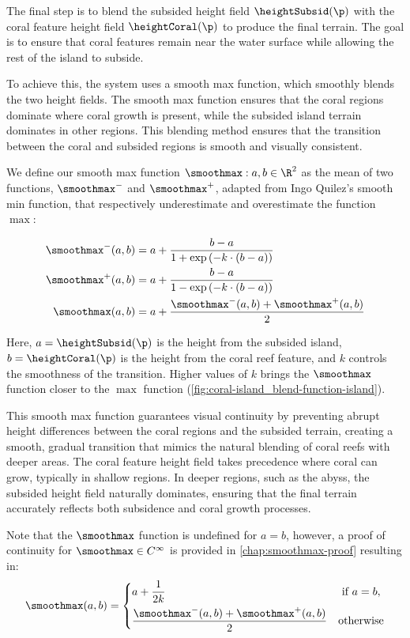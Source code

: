 The final step is to blend the subsided height field $\heightSubsid(\p)$ with the coral feature height field $\heightCoral(\p)$ to produce the final terrain. The goal is to ensure that coral features remain near the water surface while allowing the rest of the island to subside.

To achieve this, the system uses a smooth max function, which smoothly blends the two height fields. The smooth max function ensures that the coral regions dominate where coral growth is present, while the subsided island terrain dominates in other regions. This blending method ensures that the transition between the coral and subsided regions is smooth and visually consistent.

We define our smooth max function $\smoothmax: a, b \in \R^2$ as the mean of two functions, $\smoothmax^-$ and $\smoothmax^+$, adapted from Ingo Quilez's smooth min function, that respectively underestimate and overestimate the function $\max$:

\begin{align}
    \smoothmax^-(a, b) &= a + \frac{b - a}{1 + \exp\left(-k \cdot (b - a) \right)} \\
    \smoothmax^+(a, b) &= a + \frac{b - a}{1 - \exp\left(-k \cdot (b - a) \right)} \\
    \smoothmax(a, b)   &= a + \frac{\smoothmax^-(a, b) + \smoothmax^+(a, b)}{2} %
\end{align}

Here, $a = \heightSubsid(\p)$ is the height from the subsided island, $b = \heightCoral(\p)$ is the height from the coral reef feature, and $k$ controls the smoothness of the transition. Higher values of $k$ brings the $\smoothmax$ function closer to the $\max$ function (\cref{fig:coral-island_blend-function-island}).

This smooth max function guarantees visual continuity by preventing abrupt height differences between the coral regions and the subsided terrain, creating a smooth, gradual transition that mimics the natural blending of coral reefs with deeper areas. The coral feature height field takes precedence where coral can grow, typically in shallow regions. In deeper regions, such as the abyss, the subsided height field naturally dominates, ensuring that the final terrain accurately reflects both subsidence and coral growth processes.

Note that the $\smoothmax$ function is undefined for $a = b$, however, a proof of continuity for $\smoothmax \in C^\infty$ is provided in \cref{chap:smoothmax-proof} resulting in:
\begin{align}
    \smoothmax(a, b) = \begin{dcases}
        a + \frac{1}{2k} & \text{ if } a = b, \\
        \frac{\smoothmax^-(a, b) + \smoothmax^+(a, b)}{2} & \text{otherwise}
    \end{dcases}    
\end{align}

